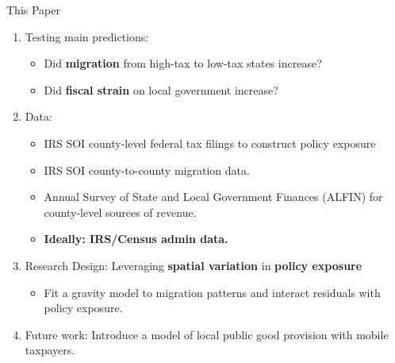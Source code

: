 \documentclass[10pt, aspectratio=169]{beamer}
\begin{document}
\begin{frame}{This Paper}
    \begin{enumerate}
        \item Testing main predictions:
        \begin{itemize}
            \item Did \textbf{migration} from high-tax to low-tax states increase?
            \item Did \textbf{fiscal strain} on local government increase?
        \end{itemize}
        \vspace{.25cm}
        \item Data:
        \begin{itemize}
            \item IRS SOI county-level federal tax filings to construct policy exposure 
            \item IRS SOI county-to-county migration data.
            \item Annual Survey of State and Local Government Finances (ALFIN) for county-level sources of revenue.
            \item \textbf{Ideally: IRS/Census admin data.}
        \end{itemize}
        \vspace{.25cm}
        \item Research Design: Leveraging \textbf{spatial variation} in \textbf{policy exposure}
        \begin{itemize}
            \item Fit a gravity model to migration patterns and interact residuals with policy exposure.
        \end{itemize}
        \vspace{.25cm}
        \item Future work: Introduce a model of local public good provision with mobile taxpayers.
    \end{enumerate}
\end{frame}
\end{document}
